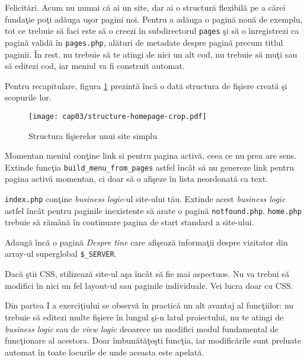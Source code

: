 Felicitări. Acum nu numai că ai un site, dar ai o structură
flexibilă pe a cărei fundaţie poţi adăuga uşor pagini noi.
Pentru a adăuga o pagină nouă de exemplu, tot ce trebuie
să faci este să o creezi în subdirectorul \texttt{pages}
şi să o înregistrezi ca pagină validă în \texttt{pages.php},
alături de metadate despre pagină precum titlul paginii.
În rest, nu trebuie să te atingi de nici un alt cod,
nu trebuie să muţi sau să editezi cod, iar meniul va fi
construit automat.

Pentru recapitulare, figura \ref{fig:filestruct-homepage}
prezintă încă o dată structura de fişiere creată
şi scopurile lor.

\begin{figure}[H]
  \centering
    \texttt{[image: cap03/structure-homepage-crop.pdf]}
  \caption{Structura fişierelor unui site simplu}
  \label{fig:filestruct-homepage}
\end{figure}

\begin{Exercise}[title={Îmbunătăţeşte-ţi pagina personală},difficulty=1]
\ExePart
Momentan meniul conţine link  si pentru pagina activă,
ceea ce nu prea are sens. Extinde funcţia
\texttt{build\_menu\_from\_pages} astfel încât să
nu genereze link pentru pagina activă momentan, ci
doar să o afişeze în lista neordonată ca text.

\ExePart
\texttt{index.php} conţine \textit{business logic}-ul site-ului tău.
Extinde acest \textit{business logic} astfel încât pentru
paginile inexistente să arate o pagină \texttt{notfound.php}.
\texttt{home.php} trebuie să rămână în continuare pagina de
start standard a site-ului.

\ExePart
Adaugă încă o pagină \textit{Despre tine}
care afişează informaţii despre vizitator din array-ul superglobal
\texttt{\$\_SERVER}.

Dacă ştii CSS, stilizează site-ul aşa încât să fie mai aspectuos.
Nu va trebui să modifici în nici un fel layout-ul sau
paginile individuale. Vei lucra doar cu CSS.
\end{Exercise}

Din partea I a exerciţiului se observă în practică un alt avantaj
al funcţiilor: nu trebuie să editezi multe fişiere în lungul
şi-n latul proiectului, nu te atingi de \textit{business logic}
sau de \textit{view logic} deoarece nu modifici modul fundamental de funcţionare
al acestora. Doar îmbunătăţeşti funcţia, iar
modificările sunt preluate automat în toate locurile de unde
aceasta este apelată.

